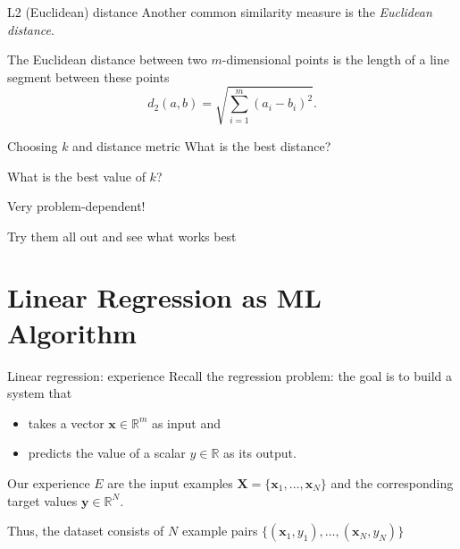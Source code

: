 \documentclass[dvipsnames]{beamer}
\begin{document}
	\begin{frame}{L2 (Euclidean) distance}
			Another common similarity measure is the \emph{Euclidean distance}.
			
			The Euclidean distance between two $m$-dimensional points is the length of a line segment between these points
			\[
			d_2(a,b) = \sqrt{\sum_{i=1}^m(a_i-b_i)^2}.
			\]
	\end{frame}
\begin{frame}{Choosing $k$ and distance metric}
What is the best distance?

What is the best value of $k$? \pause

Very problem-dependent! \pause

Try them all out and see what works best
\end{frame}

\section{Linear Regression as ML Algorithm}
		
			\begin{frame}{Linear regression: experience}
			Recall the regression problem: the goal is to build a system that 
			\begin{itemize}
				\item takes a vector $\mathbf{x} \in \mathbb{R}^m$ as input and
				\item predicts the value of a scalar $ y \in \mathbb{R}$ as its output.
			\end{itemize}  \pause
			
			Our experience $E$ are the input examples $\mathbf{X} = \{\mathbf{x}_1,\dots,\mathbf{x}_N\}$ and the corresponding target values $\mathbf{y} \in \mathbb{R}^N$. \pause
			
			Thus, the dataset consists of $N$ example pairs $\{(\mathbf{x}_1,y_1), \dots, (\mathbf{x}_N,y_N)\}$ 
			
		\end{frame}
		
\end{document}
